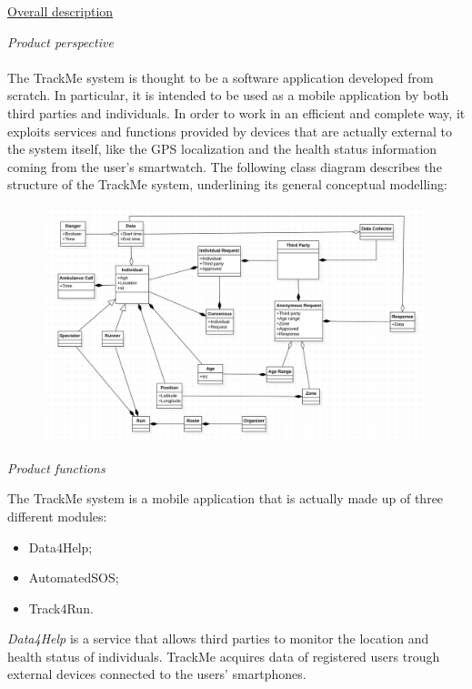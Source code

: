 \documentclass{article}
\begin{document}
\begin{legal}
  	\item \underline{Overall description}
  		\begin{legal}
    		\item \textit{Product perspective}\\\\
			{\normalfont
The TrackMe system is thought to be a software application developed from scratch. In particular, it is intended to be used as a mobile application by both third parties and individuals.
In order to work in an efficient and complete way, it exploits services and functions provided by devices that are actually external to the system itself, like the GPS 				localization and the health status information coming from the user’s smartwatch.
The following class diagram describes the structure of the TrackMe system, underlining its general conceptual modelling:
			}
			\begin{figure}[H]
  			\includegraphics[width=\linewidth]{./images/UML1-0.png}
			\end{figure}
		\item \textit{Product functions} \\
		{\normalfont
		The TrackMe system is a mobile application that is actually made up of three different modules:\\
		\begin{itemize}
		\item Data4Help;\\
		\item AutomatedSOS;\\
		\item Track4Run.\\
		\end{itemize}
\textit {Data4Help} is a service that allows third parties to monitor the location and health status of individuals. TrackMe acquires data of registered users trough external devices connected to the users' smartphones.\\
}
\end{legal}
\end{legal}
\end{document}
